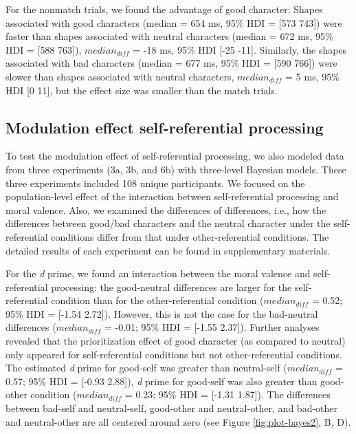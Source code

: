 \documentclass[
  man]{apa6}
\begin{document}
For the nonmatch trials, we found the advantage of good character: Shapes associated with good characters (median = 654 ms, 95\% HDI = {[}573 743{]}) were faster than shapes associated with neutral characters (median = 672 ms, 95\% HDI = {[}588 763{]}), \(median_{diff}\) = -18 ms, 95\% HDI {[}-25 -11{]}. Similarly, the shapes associated with bad characters (median = 677 ms, 95\% HDI = {[}590 766{]}) were slower than shapes associated with neutral characters, \(median_{diff}\) = 5 ms, 95\% HDI {[}0 11{]}, but the effect size was smaller than the match trials.

\hypertarget{modulation-effect-self-referential-processing}{%
\subsection{Modulation effect self-referential processing}\label{modulation-effect-self-referential-processing}}

To test the modulation effect of self-referential processing, we also modeled data from three experiments (3a, 3b, and 6b) with three-level Bayesian models. These three experiments included 108 unique participants. We focused on the population-level effect of the interaction between self-referential processing and moral valence. Also, we examined the differences of differences, i.e., how the differences between good/bad characters and the neutral character under the self-referential conditions differ from that under other-referential conditions. The detailed results of each experiment can be found in supplementary materials.

For the \emph{d} prime, we found an interaction between the moral valence and self-referential processing: the good-neutral differences are larger for the self-referential condition than for the other-referential condition (\(median_{diff}\) = 0.52; 95\% HDI = {[}-1.54 2.72{]}). However, this is not the case for the bad-neutral differences (\(median_{diff}\) = -0.01; 95\% HDI = {[}-1.55 2.37{]}). Further analyses revealed that the prioritization effect of good character (as compared to neutral) only appeared for self-referential conditions but not other-referential conditions. The estimated \emph{d} prime for good-self was greater than neutral-self (\(median_{diff}\) = 0.57; 95\% HDI = {[}-0.93 2.88{]}), \emph{d} prime for good-self was also greater than good-other condition (\(median_{diff}\) = 0.23; 95\% HDI = {[}-1.31 1.87{]}). The differences between bad-self and neutral-self, good-other and neutral-other, and bad-other and neutral-other are all centered around zero (see Figure \ref{fig:plot-bayes2}, B, D).
\end{document}
